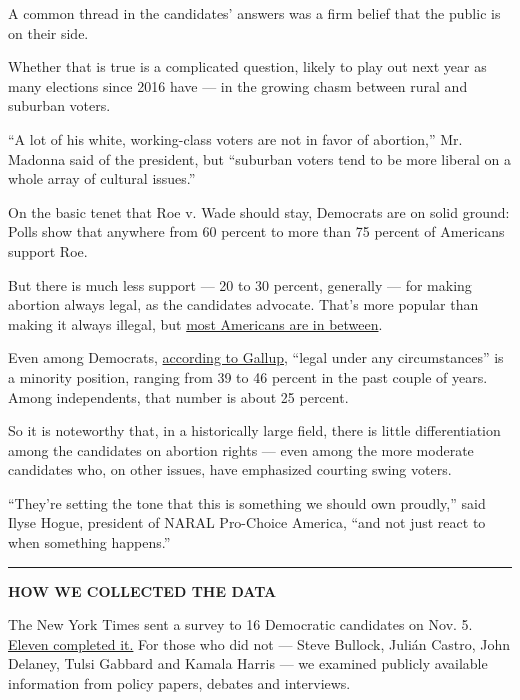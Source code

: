 A common thread in the candidates' answers was a firm belief that the
public is on their side.

Whether that is true is a complicated question, likely to play out next
year as many elections since 2016 have --- in the growing chasm between
rural and suburban voters.

``A lot of his white, working-class voters are not in favor of
abortion,'' Mr. Madonna said of the president, but ``suburban voters
tend to be more liberal on a whole array of cultural issues.''

On the basic tenet that Roe v. Wade should stay, Democrats are on solid
ground: Polls show that anywhere from 60 percent to more than 75 percent
of Americans support Roe.

But there is much less support --- 20 to 30 percent, generally --- for
making abortion always legal, as the candidates advocate. That's more
popular than making it always illegal, but
\href{https://news.gallup.com/poll/1576/Abortion.aspx}{most Americans
are in between}.

Even among Democrats,
\href{https://news.gallup.com/poll/246278/abortion-trends-party.aspx}{according
to Gallup}, ``legal under any circumstances'' is a minority position,
ranging from 39 to 46 percent in the past couple of years. Among
independents, that number is about 25 percent.

So it is noteworthy that, in a historically large field, there is little
differentiation among the candidates on abortion rights --- even among
the more moderate candidates who, on other issues, have emphasized
courting swing voters.

``They're setting the tone that this is something we should own
proudly,'' said Ilyse Hogue, president of NARAL Pro-Choice America,
``and not just react to when something happens.''

\begin{center}\rule{0.5\linewidth}{\linethickness}\end{center}

\textbf{HOW WE COLLECTED THE DATA}

The New York Times sent a survey to 16 Democratic candidates on Nov. 5.
\href{https://www.nytimes3xbfgragh.onion/2019/11/25/us/politics/democratic-candidates-abortion-survey.html}{Eleven
completed it.} For those who did not --- Steve Bullock, Julián Castro,
John Delaney, Tulsi Gabbard and Kamala Harris --- we examined publicly
available information from policy papers, debates and interviews.

